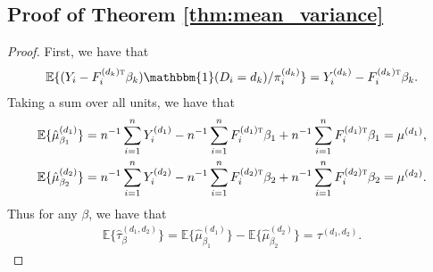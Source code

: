 \documentclass[twoside]{article}
\theoremstyle{plain}
\theoremstyle{definition}
\theoremstyle{remark}
\newcommand{\E}{\mathbb{E}}
\def\T{{\textsc{t}}}
\newcommand{\indicator}{\mathbbm{1}}
\newcommand{\sumi}{\sum_{i=1}^n}
\begin{document}
\subsection{Proof of Theorem \ref{thm:mean_variance}}
\begin{proof}
    First, we have that
    \begin{eqnarray*}
        \E\{(Y_i - F_i^{(d_k)\T} \beta_k)\indicator(D_i=d_k)/\pi_i^{(d_k)}\} = Y_i^{(d_k)} - F_i^{(d_k)\T} \beta_k.
    \end{eqnarray*}
    Taking a sum over all units, we have that
    \begin{eqnarray*}
        \E\{\hat\mu{}^{(d_1)}_{\beta_1}\} = n^{-1} \sumi Y_i^{(d_1)} - n^{-1} \sumi F_i^{(d_1)\T} \beta_1 + n^{-1} \sumi F_i^{(d_1)\T} \beta_1 = \mu^{(d_1)}, \\
        \E\{\hat\mu{}^{(d_2)}_{\beta_2}\} = n^{-1} \sumi Y_i^{(d_2)} - n^{-1} \sumi F_i^{(d_2)\T} \beta_2 + n^{-1} \sumi F_i^{(d_2)\T} \beta_2 = \mu^{(d_2)}.
    \end{eqnarray*}
    Thus for any $\beta$, we have that
    \begin{eqnarray*}
        \E\{\hat\tau^{(d_1, d_2)}_{\beta}\} = \E\{\hat\mu^{(d_1)}_{\beta_1}\} - \E\{\hat\mu^{(d_2)}_{\beta_2}\} = \tau^{(d_1, d_2)}.
    \end{eqnarray*}


\end{proof}
\end{document}
